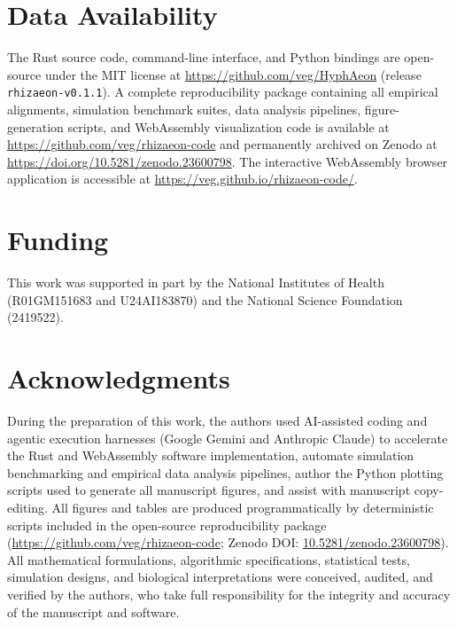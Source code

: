 \section*{Data Availability}
The \RhizAeon Rust source code, command-line interface, and Python bindings are open-source under the MIT license at \url{https://github.com/veg/HyphAeon} (release \texttt{rhizaeon-v0.1.1}). A complete reproducibility package containing all empirical alignments, simulation benchmark suites, data analysis pipelines, figure-generation scripts, and WebAssembly visualization code is available at \url{https://github.com/veg/rhizaeon-code} and permanently archived on Zenodo at \href{https://doi.org/10.5281/zenodo.23600798}{https://doi.org/10.5281/zenodo.23600798}. The interactive WebAssembly browser application is accessible at \url{https://veg.github.io/rhizaeon-code/}.

\section*{Funding}
This work was supported in part by the National Institutes of Health (R01GM151683 and U24AI183870) and the National Science Foundation (2419522).

\section*{Acknowledgments}
During the preparation of this work, the authors used AI-assisted coding and agentic execution harnesses (Google Gemini and Anthropic Claude) to accelerate the Rust and WebAssembly software implementation, automate simulation benchmarking and empirical data analysis pipelines, author the Python plotting scripts used to generate all manuscript figures, and assist with manuscript copy-editing. All figures and tables are produced programmatically by deterministic scripts included in the open-source reproducibility package (\url{https://github.com/veg/rhizaeon-code}; Zenodo DOI: \href{https://doi.org/10.5281/zenodo.23600798}{10.5281/zenodo.23600798}). All mathematical formulations, algorithmic specifications, statistical tests, simulation designs, and biological interpretations were conceived, audited, and verified by the authors, who take full responsibility for the integrity and accuracy of the manuscript and software.
